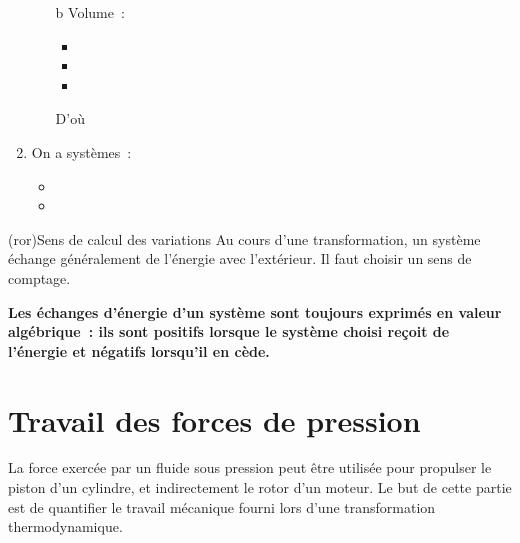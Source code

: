 \documentclass[../../main/main.tex]{subfiles}
\begin{document}
\begin{tcb*}[breakable]
\begin{enumerate}
\begin{itemize}
			      \item[b]{Volume}~:
			      \begin{itemize}
				      \item {}
				      \item {}
				      \item {}
			      \end{itemize}
			      D'où
			      \psw{%
				      \[
					      \boxed{P_{f,1} = P_{f,2} = \frac{3}{2}\frac{nRT_0}{V_i}}
				      \]
			      }%
		      \end{itemize}
		\item On a  systèmes~: 
		      \begin{itemize}
			      \item {}
			      \item {}
		      \end{itemize}
	\end{enumerate}
\end{tcb*}

\begin{tcb*}(ror){Sens de calcul des variations}
	Au cours d'une transformation, un système échange généralement de l'énergie
	avec l'extérieur. Il faut choisir un sens de comptage.
	\begin{center}
		\bfseries
		Les échanges d'énergie d'un système sont toujours exprimés en valeur
		algébrique~: ils sont positifs lorsque le système choisi reçoit de l'énergie
		et négatifs lorsqu'il en cède.
	\end{center}
\end{tcb*}

\section{Travail des forces de pression}
La force exercée par un fluide sous pression peut être utilisée pour propulser
le piston d'un cylindre, et indirectement le rotor d'un moteur. Le but de cette
partie est de quantifier le travail mécanique fourni lors d'une transformation
thermodynamique.
\end{document}

